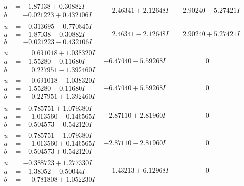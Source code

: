 \documentclass[1p]{elsarticle_modified}
\theoremstyle{definition}
\begin{document}
$$\begin{array}{c|c|c}
\begin{aligned}
a &= -1.87038 + 0.30882 I \\
b &= -0.021223 + 0.432106 I\end{aligned}
 & \phantom{-}2.46341 + 2.12648 I & \phantom{-}2.90240 - 5.27421 I \\ \hline\begin{aligned}
u &= -0.313695 - 0.770845 I \\
a &= -1.87038 - 0.30882 I \\
b &= -0.021223 - 0.432106 I\end{aligned}
 & \phantom{-}2.46341 - 2.12648 I & \phantom{-}2.90240 + 5.27421 I \\ \hline\begin{aligned}
u &= \phantom{-}0.691018 + 1.038320 I \\
a &= -1.55280 + 0.11680 I \\
b &= \phantom{-}0.227951 - 1.392460 I\end{aligned}
 & -6.47040 - 5.59268 I & \phantom{-0.000000 } 0 \\ \hline\begin{aligned}
u &= \phantom{-}0.691018 - 1.038320 I \\
a &= -1.55280 - 0.11680 I \\
b &= \phantom{-}0.227951 + 1.392460 I\end{aligned}
 & -6.47040 + 5.59268 I & \phantom{-0.000000 } 0 \\ \hline\begin{aligned}
u &= -0.785751 + 1.079380 I \\
a &= \phantom{-}1.013560 - 0.146565 I \\
b &= -0.504573 - 0.542120 I\end{aligned}
 & -2.87110 + 2.81960 I & \phantom{-0.000000 } 0 \\ \hline\begin{aligned}
u &= -0.785751 - 1.079380 I \\
a &= \phantom{-}1.013560 + 0.146565 I \\
b &= -0.504573 + 0.542120 I\end{aligned}
 & -2.87110 - 2.81960 I & \phantom{-0.000000 } 0 \\ \hline\begin{aligned}
u &= -0.388723 + 1.277330 I \\
a &= -1.38052 - 0.50044 I \\
b &= \phantom{-}0.781808 + 1.052230 I\end{aligned}
 & \phantom{-}1.43213 + 6.12968 I & \phantom{-0.000000 } 0 \\ \hline\begin{aligned}

\end{aligned}
\end{array}$$
\end{document}
